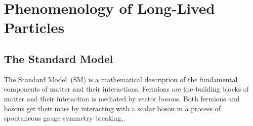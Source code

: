 \chapter{Phenomenology of Long-Lived Particles}
\label{Long_Lived_Particle_physics_chapter}
\section{The Standard Model}
The Standard Model~(SM) is a mathematical description of the fundamental components of matter and their interactions. Fermions are the building blocks of matter and their interaction  is mediated by vector bosons. Both fermions and bosons get their mass by interacting with a scalar boson in a process of spontaneous gauge symmetry breaking,\cite{SMREV}. 
